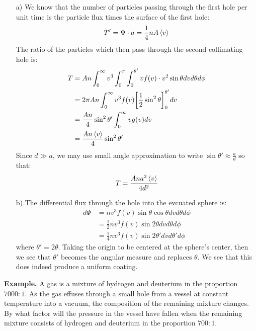 \documentclass[a4paper,11pt,oneside]{book}
\begin{document}
\begin{mdframed}
\begin{solution}
\begin{enumerate}
    \item[a)] We know that the number of particles passing through the first hole per unit time is the particle flux times the surface of the first hole:
    \begin{equation}
        T' = \Psi \cdot a = \frac{1}{4}nA \braket{v}
    \end{equation}
    The ratio of the particles which then pass through the second collimating hole is:
    \begin{align}
        T &= A n \int_0^\infty v^3 \int_0^\pi \int_0^{\theta'} vf(v) \cdot v^2 \sin \theta dv d\theta d\phi \\
        &= 2 \pi A n \int_0^\infty v^3 f(v) \bigg[\frac{1}{2} \sin^2 \theta \bigg]_0^{\theta'} dv\\
        &= \frac{An}{4} \sin^2 \theta' \int_0^\infty v g(v) dv\\
        &= \frac{An\braket{v}}{4} \sin^2 \theta'
    \end{align}
    Since $d \gg a$, we may use small angle approximation to write $\sin \theta' \approx \frac{a}{d}$ so that:
    \begin{align}
        T = \frac{Ana^2\braket{v}}{4d^2}
    \end{align}
    \item[b)] The differential flux through the hole into the evcuated sphere is:
    \begin{align}
        d\Phi &= nv^3 f(v) \sin \theta \cos \theta dv d\theta d\phi\\
        &= \frac{1}{2} nv^3 f(v) \sin 2\theta dv d\theta d\phi\\
        &= \frac{1}{4} nv^3 f(v) \sin 2\theta' dv d\theta' d\phi
    \end{align}
    where $\theta'=2\theta$. Taking the origin to be centered at the sphere's center, then we see that $\theta'$ becomes the angular measure and replaces $\theta$. We see that this does indeed produce a uniform coating. 
\end{enumerate}
\end{solution}
\end{mdframed}
\begin{strategy}
\sffamily \textbf{Example.}  
A gas is a mixture of hydrogen and deuterium in the proportion $7000:1$. As the gas effuses through
a small hole from a vessel at constant temperature into a vacuum, the composition of
the remaining mixture changes. By what factor will the pressure in the vessel have
fallen when the remaining mixture consists of hydrogen and deuterium in the proportion $700:1$.
\end{strategy}
\end{document}
